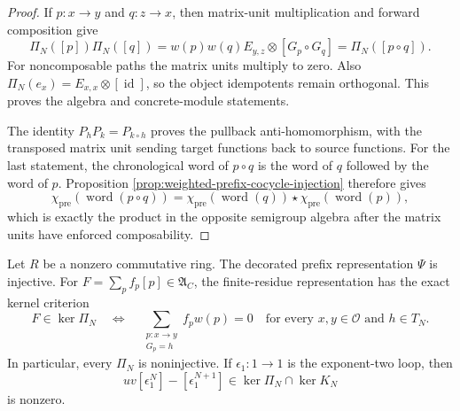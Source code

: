 \begin{proof}
If $p:x\to y$ and $q:z\to x$, then matrix-unit multiplication and forward
composition give
\[
 \Pi_N([p])\Pi_N([q])
 =w(p)w(q)E_{y,z}\otimes[G_p\circ G_q]
 =\Pi_N([p\circ q]).
\]
For noncomposable paths the matrix units multiply to zero.  Also
$\Pi_N(e_x)=E_{x,x}\otimes[\operatorname{id}]$, so the object idempotents
remain orthogonal.  This proves the algebra and concrete-module statements.

The identity $P_hP_k=P_{k\circ h}$ proves the pullback anti-homomorphism,
with the transposed matrix unit sending target functions back to source
functions.  For the last statement, the chronological word of $p\circ q$ is
the word of $q$ followed by the word of $p$.  Proposition
\ref{prop:weighted-prefix-cocycle-injection} therefore gives
\[
 \chi_{\mathrm{pre}}(\operatorname{word}(p\circ q))
 =\chi_{\mathrm{pre}}(\operatorname{word}(q))\star
  \chi_{\mathrm{pre}}(\operatorname{word}(p)),
\]
which is exactly the product in the opposite semigroup algebra after the
matrix units have enforced composability.
\end{proof}

\begin{theorem}
\label{thm:weighted-typed-representation-kernels}
Let $R$ be a nonzero commutative ring.  The decorated prefix representation
$\Psi$ is injective.  For
$F=\sum_p f_p[p]\in\mathfrak A_C$, the finite-residue representation has the
exact kernel criterion
\begin{equation}
\label{eq:weighted-finite-representation-kernel}
 F\in\ker\Pi_N
 \quad\Longleftrightarrow\quad
 \sum_{\substack{p:x\to y\\G_p=h}}f_p w(p)=0
 \quad\text{for every }x,y\in\mathcal O\text{ and }h\in T_N.
\end{equation}
In particular, every $\Pi_N$ is noninjective.  If
$\epsilon_1:1\to1$ is the exponent-two loop, then
\begin{equation}
\label{eq:weighted-explicit-finite-kernel-element}
 uv[\epsilon_1^N]-[\epsilon_1^{N+1}]
 \in\ker\Pi_N\cap\ker K_N
\end{equation}
is nonzero.
\end{theorem}

